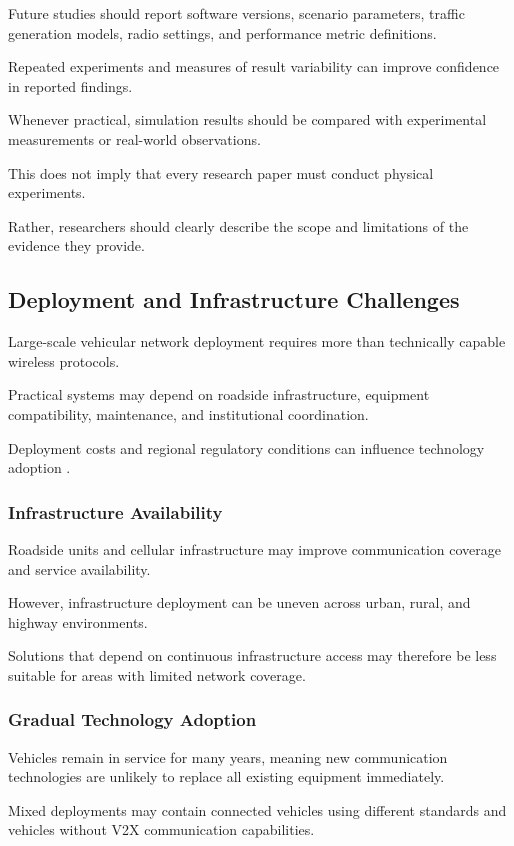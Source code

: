 Future studies should
report software versions,
scenario parameters,
traffic generation
models, radio settings,
and performance
metric definitions.

Repeated experiments
and measures of
result variability
can improve confidence
in reported findings.

Whenever practical,
simulation results
should be compared
with experimental
measurements or
real-world observations.

This does not imply
that every research
paper must conduct
physical experiments.

Rather, researchers
should clearly
describe the scope
and limitations
of the evidence
they provide.

\subsection{Deployment and Infrastructure Challenges}

Large-scale vehicular
network deployment
requires more than
technically capable
wireless protocols.

Practical systems
may depend on
roadside infrastructure,
equipment compatibility,
maintenance,
and institutional
coordination.

Deployment costs
and regional
regulatory conditions
can influence
technology adoption
\cite{MacHardy2018}.

\subsubsection{Infrastructure Availability}

Roadside units
and cellular
infrastructure
may improve
communication
coverage and
service availability.

However, infrastructure
deployment can be
uneven across
urban, rural,
and highway
environments.

Solutions that depend
on continuous
infrastructure access
may therefore be
less suitable for
areas with limited
network coverage.

\subsubsection{Gradual Technology Adoption}

Vehicles remain in
service for many
years, meaning
new communication
technologies are
unlikely to replace
all existing equipment
immediately.

Mixed deployments
may contain connected
vehicles using
different standards
and vehicles without
V2X communication
capabilities.

